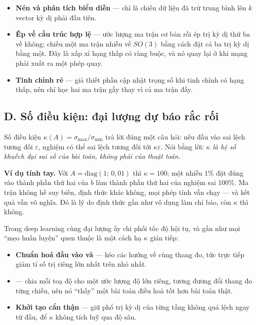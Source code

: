 \documentclass[../../../deep_learning.tex]{subfiles}
\begin{document}
\begin{itemize}
\item \textbf{Nén và phân tích biểu diễn} ---  chỉ là chiếu dữ liệu đã trừ trung bình lên \(k\) vector kỳ dị phải đầu tiên.
\item \textbf{Ép về cấu trúc hợp lệ} --- ước lượng ma trận cơ bản rồi ép trị kỳ dị thứ ba về không; chiếu một ma trận nhiễu về \(SO(3)\) bằng cách đặt cả ba trị kỳ dị bằng một. Đây là xấp xỉ hạng thấp có ràng buộc, và nó quay lại ở  khi mạng phải xuất ra một phép quay.
\item \textbf{Tinh chỉnh rẻ} ---  \cite{hu2022lora} giả thiết phần cập nhật trọng số khi tinh chỉnh có hạng thấp, nên chỉ học hai ma trận gầy thay vì cả ma trận đầy.

\end{itemize}

\subsection{D. Số điều kiện: đại lượng dự báo rắc rối}
Số điều kiện \(\kappa(A) = \sigma_{\max}/\sigma_{\min}\) trả lời đúng một câu hỏi: nếu đầu vào sai lệch tương đối \(\varepsilon\), nghiệm có thể sai lệch tương đối tới \(\kappa\varepsilon\). Nói bằng lời: \emph{\(\kappa\) là hệ số khuếch đại sai số của bài toán, không phải của thuật toán.}

\textbf{Ví dụ tính tay.} Với \(A = \mathrm{diag}(1;\,0{,}01)\) thì \(\kappa = 100\); một nhiễu \(1\%\) đặt đúng vào thành phần thứ hai của \(b\) làm thành phần thứ hai của nghiệm sai \(100\%\). Ma trận không hề suy biến, định thức khác không, mọi phép tính vẫn chạy --- và kết quả vẫn vô nghĩa. Đó là lý do định thức gần như vô dụng làm chỉ báo, còn \(\kappa\) thì không.

Trong deep learning cùng đại lượng ấy chi phối tốc độ hội tụ, và gần như mọi ``mẹo huấn luyện'' quen thuộc là một cách hạ \(\kappa\) gián tiếp:

\begin{itemize}
\item \textbf{Chuẩn hoá đầu vào và } \cite{ioffe2015batchnorm} --- kéo các hướng về cùng thang đo, tức trực tiếp giảm tỉ số trị riêng lớn nhất trên nhỏ nhất.
\item \textbf{} \cite{kingma2015adam} --- chia mỗi toạ độ cho một ước lượng độ lớn riêng, tương đương đổi thang đo từng chiều, nên nó ``thấy'' một bài toán điều hoà tốt hơn bài toán thật.
\item \textbf{Khởi tạo cẩn thận} --- giữ phổ trị kỳ dị của từng tầng không quá lệch ngay từ đầu, để \(\kappa\) không tích luỹ qua độ sâu.
\end{itemize}
\end{document}
